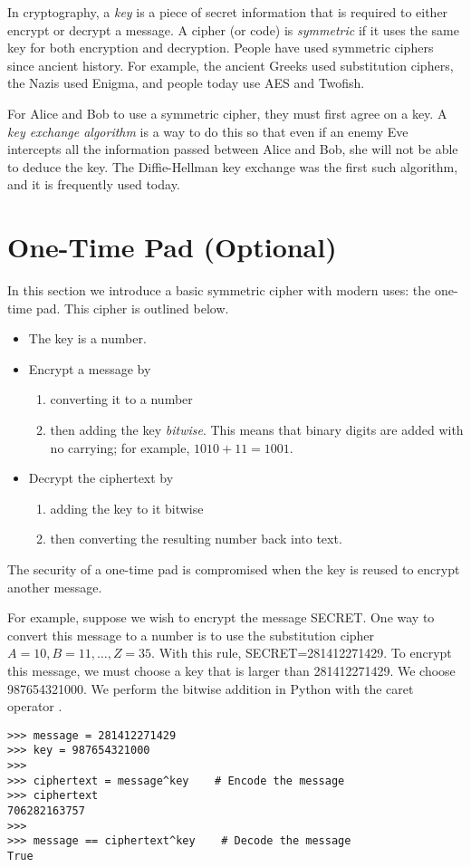 

In cryptography, a \emph{key} is a piece of secret information that is required to either encrypt or decrypt a message.
A cipher (or code) is \emph{symmetric} if it uses the same key for both encryption and decryption.
People have used symmetric ciphers since ancient history.
For example, the ancient Greeks used substitution ciphers, the Nazis used Enigma, and people today use AES and Twofish.

For Alice and Bob to use a symmetric cipher, they must first agree on a key.
A \emph{key exchange algorithm} is a way to do this so that even if an enemy Eve intercepts all the information passed between Alice and Bob, she will not be able to deduce the key.
The Diffie-Hellman key exchange was the first such algorithm, and it is frequently used today.

\section*{One-Time Pad (Optional)}
In this section we introduce a basic symmetric cipher with modern uses: the one-time pad.
This cipher is outlined below.
\begin{itemize}
\item The key is a number.
\item Encrypt a message by 
\begin{enumerate}
\item converting it to a number
\item then adding the key \emph{bitwise}. This means that binary digits are added with no carrying; for example, $1010+11=1001$.
\end{enumerate}
\item Decrypt the ciphertext by 
\begin{enumerate}
\item adding the key to it bitwise
\item then converting the resulting number back into text.
\end{enumerate}
\end{itemize}
The security of a one-time pad is compromised when the key is reused to encrypt another message.

For example, suppose we wish to encrypt the message SECRET.
One way to convert this message to a number is to use the substitution cipher $A=10, B=11, \ldots, Z=35$.
With this rule, SECRET=281412271429.
To encrypt this message, we must choose a key that is larger than 281412271429.
We choose 987654321000. 
We perform the bitwise addition in Python with the caret operator \li{^}.
\begin{lstlisting}
>>> message = 281412271429
>>> key = 987654321000
>>>
>>> ciphertext = message^key    # Encode the message
>>> ciphertext
706282163757
>>>
>>> message == ciphertext^key    # Decode the message
True
\end{lstlisting}

